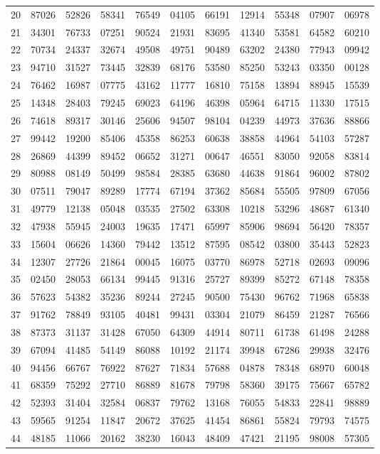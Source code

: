 \begin{table}
\begin{otherlanguage}{english}
\begin{tabular}{|C|CCCCCCCCCC|}
20&87026&52826&58341&76549&04105&66191&12914&55348&07907&06978\\
21&34301&76733&07251&90524&21931&83695&41340&53581&64582&60210\\
22&70734&24337&32674&49508&49751&90489&63202&24380&77943&09942\\
23&94710&31527&73445&32839&68176&53580&85250&53243&03350&00128\\
24&76462&16987&07775&43162&11777&16810&75158&13894&88945&15539\\[1ex]
25&14348&28403&79245&69023&64196&46398&05964&64715&11330&17515\\
26&74618&89317&30146&25606&94507&98104&04239&44973&37636&88866\\
27&99442&19200&85406&45358&86253&60638&38858&44964&54103&57287\\
28&26869&44399&89452&06652&31271&00647&46551&83050&92058&83814\\
29&80988&08149&50499&98584&28385&63680&44638&91864&96002&87802\\[1ex]
30&07511&79047&89289&17774&67194&37362&85684&55505&97809&67056\\
31&49779&12138&05048&03535&27502&63308&10218&53296&48687&61340\\
32&47938&55945&24003&19635&17471&65997&85906&98694&56420&78357\\
33&15604&06626&14360&79442&13512&87595&08542&03800&35443&52823\\
34&12307&27726&21864&00045&16075&03770&86978&52718&02693&09096\\[1ex]
35&02450&28053&66134&99445&91316&25727&89399&85272&67148&78358\\
36&57623&54382&35236&89244&27245&90500&75430&96762&71968&65838\\
37&91762&78849&93105&40481&99431&03304&21079&86459&21287&76566\\
38&87373&31137&31428&67050&64309&44914&80711&61738&61498&24288\\
39&67094&41485&54149&86088&10192&21174&39948&67286&29938&32476\\[1ex]
40&94456&66767&76922&87627&71834&57688&04878&78348&68970&60048\\
41&68359&75292&27710&86889&81678&79798&58360&39175&75667&65782\\
42&52393&31404&32584&06837&79762&13168&76055&54833&22841&98889\\
43&59565&91254&11847&20672&37625&41454&86861&55824&79793&74575\\
44&48185&11066&20162&38230&16043&48409&47421&21195&98008&57305\\[1ex]

\end{tabular}
\end{otherlanguage}
\end{table}
